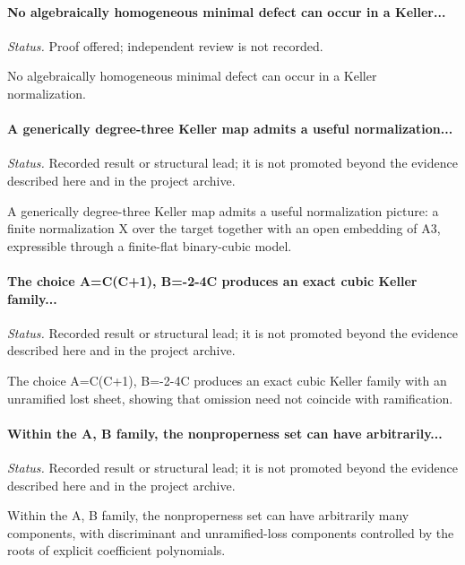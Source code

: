 \label{supp-note-01-011}
\paragraph{No algebraically homogeneous minimal defect can occur in a Keller...}
\emph{Status.} Proof offered; independent review is not recorded.

No algebraically homogeneous minimal defect can occur in a Keller normalization.

\label{supp-note-01-012}
\paragraph{A generically degree-three Keller map admits a useful normalization...}
\emph{Status.} Recorded result or structural lead; it is not promoted beyond the evidence described here and in the project archive.

A generically degree-three Keller map admits a useful normalization picture: a finite normalization X over the target together with an open embedding of A3, expressible through a finite-flat binary-cubic model.

\label{supp-note-01-013}
\paragraph{The choice A=C(C+1), B=-2-4C produces an exact cubic Keller family...}
\emph{Status.} Recorded result or structural lead; it is not promoted beyond the evidence described here and in the project archive.

The choice A=C(C+1), B=-2-4C produces an exact cubic Keller family with an unramified lost sheet, showing that omission need not coincide with ramification.

\label{supp-note-01-014}
\paragraph{Within the A, B family, the nonproperness set can have arbitrarily...}
\emph{Status.} Recorded result or structural lead; it is not promoted beyond the evidence described here and in the project archive.

Within the A, B family, the nonproperness set can have arbitrarily many components, with discriminant and unramified-loss components controlled by the roots of explicit coefficient polynomials.

\label{supp-note-01-015}
